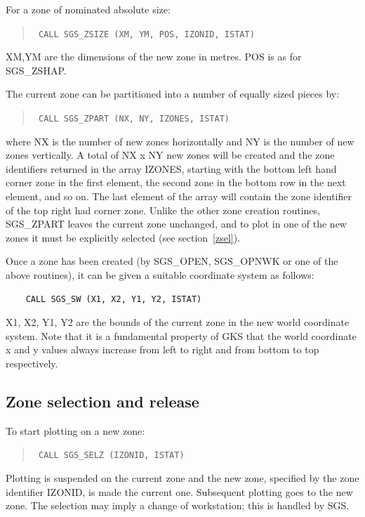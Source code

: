 \documentclass[11pt]{article}
\newcommand{\hyperref}[4]{#2\ref{#4}#3}
\newcommand{\htmlref}[2]{#1}
\begin{document}
For a zone of nominated absolute size:
\begin{quote}{\tt
    CALL \htmlref{SGS\_ZSIZE}{SGS_ZSIZE} (XM, YM, POS, IZONID, ISTAT)}
\end{quote}
XM,YM are the dimensions of the new zone in metres.  POS is as for
SGS\_ZSHAP.

The current zone can be partitioned into a number of equally sized pieces
by:
\begin{quote}{\tt
    CALL \htmlref{SGS\_ZPART}{SGS_ZPART} (NX, NY, IZONES, ISTAT)}
\end{quote}
where NX is the number of new zones horizontally and NY is the number of new
zones vertically.  A total of NX x NY new zones will be created and the zone
identifiers
returned in the array IZONES, starting with the bottom left hand corner zone in
the first element, the second zone in the bottom row in the next element, and
so on.  The last element of the array will contain the zone
identifier of the top right
had corner zone.  Unlike the other zone creation routines, SGS\_ZPART leaves the
current zone unchanged, and to plot in one of the new zones it must be
explicitly selected (see \hyperref{this section}{section~}{}{zsel}).

Once a zone has been created (by SGS\_OPEN, SGS\_OPNWK or one of the
above routines), it can be given a suitable coordinate
system as follows:
\begin{verbatim}
    CALL SGS_SW (X1, X2, Y1, Y2, ISTAT)
\end{verbatim}
X1, X2, Y1, Y2 are the bounds of the current zone in the new
world coordinate system.  Note that it is a fundamental property of GKS that
the world coordinate x and y values always increase from left to right and
from bottom to top respectively.

\subsection {\label{zsel}Zone selection and release}

To start plotting on a new \htmlref{zone}{zones}:
\begin{quote}{\tt
    CALL \htmlref{SGS\_SELZ}{SGS_SELZ} (IZONID, ISTAT)}
\end{quote}
Plotting is suspended on the current zone and the new
zone, specified by the zone identifier IZONID, is made
the current one.  Subsequent plotting goes to the new
zone.  The selection may imply a change of workstation;  this is 
handled by SGS.
\end{document}
